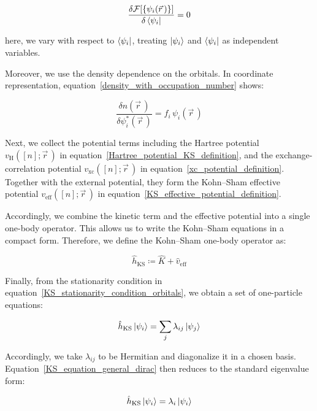 \begin{equation}
    \frac{\delta\mathcal{F}[\{\psi_i(\vec{r}\,)\}]}{\delta\bra{\psi_i}}=0
\label{KS_stationarity_condition_orbitals}
\end{equation}

here, we vary with respect to $\bra{\psi_i}$, treating $\ket{\psi_i}$ and $\bra{\psi_i}$ as independent variables.

Moreover, we use the density dependence on the orbitals.
In coordinate representation, equation~\eqref{density_with_occupation_number} shows:

\begin{equation}
    \frac{\delta n(\vec{r}\,)}{\delta \psi_i^\ast(\vec{r}\,)}
    =f_i\,\psi_i(\vec{r}\,)
\label{KS_density_orbital_derivative}
\end{equation}

Next, we collect the potential terms including
the Hartree potential $v_\mathrm{H}([n];\vec{r}\,)$ in equation~\eqref{Hartree_potential_KS_definition},
and the exchange-correlation potential $v_\mathrm{xc}([n];\vec{r}\,)$ in equation~\eqref{xc_potential_definition}.
Together with the external potential, they form the Kohn--Sham effective potential $v_\mathrm{eff}([n];\vec{r}\,)$ in equation~\eqref{KS_effective_potential_definition}.

Accordingly, we combine the kinetic term and the effective potential into a single one-body operator.
This allows us to write the Kohn--Sham equations in a compact form.
Therefore, we define the Kohn--Sham one-body operator as:

\begin{equation}
    \hat{h}_\mathrm{KS}\coloneqq
    \hat{K}+\hat{v}_\mathrm{eff}
\label{KS_one_body_hamiltonian_definition}
\end{equation}

Finally, from the stationarity condition in equation~\eqref{KS_stationarity_condition_orbitals},
we obtain a set of one-particle equations:

\begin{equation}
    \hat{h}_\mathrm{KS}\ket{\psi_i} =
    \sum_j\lambda_{ij}\ket{\psi_j}
\label{KS_equation_general_dirac}
\end{equation}

Accordingly, we take $\lambda_{ij}$ to be Hermitian and diagonalize it in a chosen basis.
Equation~\eqref{KS_equation_general_dirac} then reduces to the standard eigenvalue form:

\begin{equation}
    \hat{h}_\mathrm{KS}\ket{\psi_i} =
    \lambda_i\ket{\psi_i}
\label{KS_equation_diagonal_dirac}
\end{equation}

